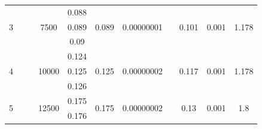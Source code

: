 \documentclass[a4paper,12pt]{article}
\begin{document}
\begin{table}[h!]
\begin{tabular}{|c|c|c|c|c|c|c|c|c|c|c|}
			\multirow{3}{*}{3} &                        &                                                          & \multirow{3}{*}{7500}  & 0.088  & \multirow{3}{*}{0.089} & \multirow{3}{*}{0.00000001} &                                 & \multirow{3}{*}{0.101} & \multirow{3}{*}{0.001} & \multirow{3}{*}{1.178} \\ \cline{5-5}
			&                        &                                                          &                        & 0.089  &                        &                             &                                 &                        &                        &                        \\ \cline{5-5}
			&                        &                                                          &                        & 0.09   &                        &                             &                                 &                        &                        &                        \\ \cline{1-1} \cline{4-7} \cline{9-11} 
			\multirow{3}{*}{4} &                        &                                                          & \multirow{3}{*}{10000} & 0.124  & \multirow{3}{*}{0.125} & \multirow{3}{*}{0.00000002} &                                 & \multirow{3}{*}{0.117} & \multirow{3}{*}{0.001} & \multirow{3}{*}{1.178} \\ \cline{5-5}
			&                        &                                                          &                        & 0.125  &                        &                             &                                 &                        &                        &                        \\ \cline{5-5}
			&                        &                                                          &                        & 0.126  &                        &                             &                                 &                        &                        &                        \\ \cline{1-1} \cline{4-7} \cline{9-11} 
			\multirow{3}{*}{5} &                        &                                                          & \multirow{3}{*}{12500} & 0.175  & \multirow{3}{*}{0.175} & \multirow{3}{*}{0.00000002} &                                 & \multirow{3}{*}{0.13}  & \multirow{3}{*}{0.001} & \multirow{3}{*}{1.8}   \\ \cline{5-5}
			&                        &                                                          &                        & 0.176  &                        &                             &                                 &                        &                        &                        \\ \cline{5-5}

\end{tabular}
\end{table}
\end{document}
